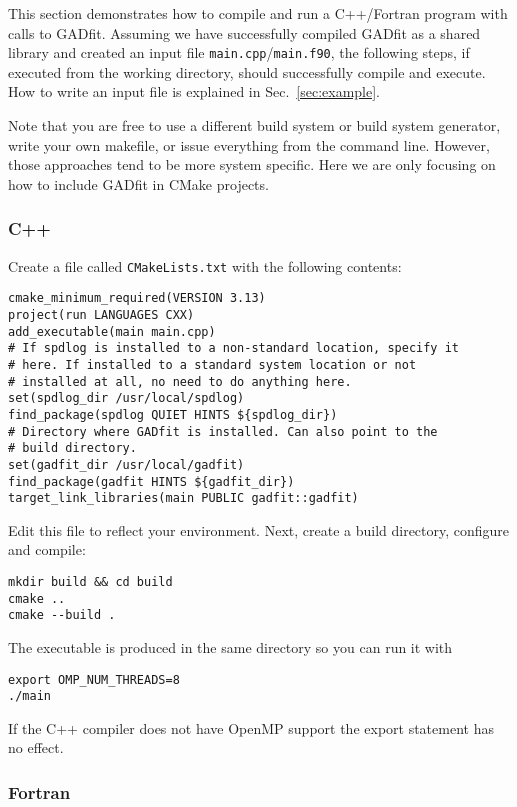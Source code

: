 \documentclass{article}
\begin{document}
This section demonstrates how to compile and run a C++/Fortran program with calls to GADfit. Assuming we have successfully compiled GADfit as a shared library and created an input file \verb+main.cpp+/\verb+main.f90+, the following steps, if executed from the working directory, should successfully compile and execute. How to write an input file is explained in Sec.~\ref{sec:example}.

Note that you are free to use a different build system or build system generator, write your own makefile, or issue everything from the command line. However, those approaches tend to be more system specific. Here we are only focusing on how to include GADfit in CMake projects.

\subsubsection{C++}

Create a file called \verb+CMakeLists.txt+ with the following contents:
\begin{verbatim}
cmake_minimum_required(VERSION 3.13)
project(run LANGUAGES CXX)
add_executable(main main.cpp)
# If spdlog is installed to a non-standard location, specify it
# here. If installed to a standard system location or not
# installed at all, no need to do anything here.
set(spdlog_dir /usr/local/spdlog)
find_package(spdlog QUIET HINTS ${spdlog_dir})
# Directory where GADfit is installed. Can also point to the
# build directory.
set(gadfit_dir /usr/local/gadfit)
find_package(gadfit HINTS ${gadfit_dir})
target_link_libraries(main PUBLIC gadfit::gadfit)
\end{verbatim}
Edit this file to reflect your environment. Next, create a build directory, configure and compile:
\begin{verbatim}
mkdir build && cd build
cmake ..
cmake --build .
\end{verbatim}
The executable is produced in the same directory so you can run it with
\begin{verbatim}
export OMP_NUM_THREADS=8
./main
\end{verbatim}
If the C++ compiler does not have OpenMP support the export statement has no effect.

\subsubsection{Fortran}
\end{document}
